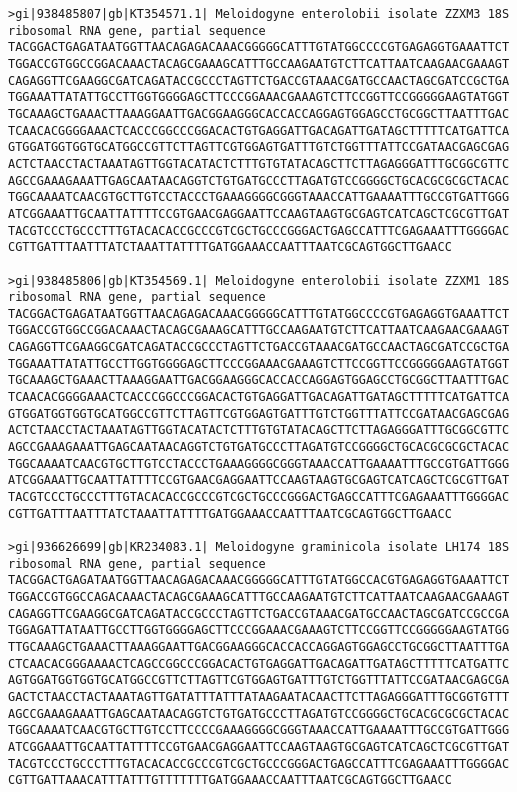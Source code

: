 \documentclass[11pt]{article}
\begin{document}
\begin{Verbatim}[commandchars=\\\{\}]
>gi|938485807|gb|KT354571.1| Meloidogyne enterolobii isolate ZZXM3 18S ribosomal RNA gene, partial sequence
TACGGACTGAGATAATGGTTAACAGAGACAAACGGGGGCATTTGTATGGCCCCGTGAGAGGTGAAATTCT
TGGACCGTGGCCGGACAAACTACAGCGAAAGCATTTGCCAAGAATGTCTTCATTAATCAAGAACGAAAGT
CAGAGGTTCGAAGGCGATCAGATACCGCCCTAGTTCTGACCGTAAACGATGCCAACTAGCGATCCGCTGA
TGGAAATTATATTGCCTTGGTGGGGAGCTTCCCGGAAACGAAAGTCTTCCGGTTCCGGGGGAAGTATGGT
TGCAAAGCTGAAACTTAAAGGAATTGACGGAAGGGCACCACCAGGAGTGGAGCCTGCGGCTTAATTTGAC
TCAACACGGGGAAACTCACCCGGCCCGGACACTGTGAGGATTGACAGATTGATAGCTTTTTCATGATTCA
GTGGATGGTGGTGCATGGCCGTTCTTAGTTCGTGGAGTGATTTGTCTGGTTTATTCCGATAACGAGCGAG
ACTCTAACCTACTAAATAGTTGGTACATACTCTTTGTGTATACAGCTTCTTAGAGGGATTTGCGGCGTTC
AGCCGAAAGAAATTGAGCAATAACAGGTCTGTGATGCCCTTAGATGTCCGGGGCTGCACGCGCGCTACAC
TGGCAAAATCAACGTGCTTGTCCTACCCTGAAAGGGGCGGGTAAACCATTGAAAATTTGCCGTGATTGGG
ATCGGAAATTGCAATTATTTTCCGTGAACGAGGAATTCCAAGTAAGTGCGAGTCATCAGCTCGCGTTGAT
TACGTCCCTGCCCTTTGTACACACCGCCCGTCGCTGCCCGGGACTGAGCCATTTCGAGAAATTTGGGGAC
CGTTGATTTAATTTATCTAAATTATTTTGATGGAAACCAATTTAATCGCAGTGGCTTGAACC

>gi|938485806|gb|KT354569.1| Meloidogyne enterolobii isolate ZZXM1 18S ribosomal RNA gene, partial sequence
TACGGACTGAGATAATGGTTAACAGAGACAAACGGGGGCATTTGTATGGCCCCGTGAGAGGTGAAATTCT
TGGACCGTGGCCGGACAAACTACAGCGAAAGCATTTGCCAAGAATGTCTTCATTAATCAAGAACGAAAGT
CAGAGGTTCGAAGGCGATCAGATACCGCCCTAGTTCTGACCGTAAACGATGCCAACTAGCGATCCGCTGA
TGGAAATTATATTGCCTTGGTGGGGAGCTTCCCGGAAACGAAAGTCTTCCGGTTCCGGGGGAAGTATGGT
TGCAAAGCTGAAACTTAAAGGAATTGACGGAAGGGCACCACCAGGAGTGGAGCCTGCGGCTTAATTTGAC
TCAACACGGGGAAACTCACCCGGCCCGGACACTGTGAGGATTGACAGATTGATAGCTTTTTCATGATTCA
GTGGATGGTGGTGCATGGCCGTTCTTAGTTCGTGGAGTGATTTGTCTGGTTTATTCCGATAACGAGCGAG
ACTCTAACCTACTAAATAGTTGGTACATACTCTTTGTGTATACAGCTTCTTAGAGGGATTTGCGGCGTTC
AGCCGAAAGAAATTGAGCAATAACAGGTCTGTGATGCCCTTAGATGTCCGGGGCTGCACGCGCGCTACAC
TGGCAAAATCAACGTGCTTGTCCTACCCTGAAAGGGGCGGGTAAACCATTGAAAATTTGCCGTGATTGGG
ATCGGAAATTGCAATTATTTTCCGTGAACGAGGAATTCCAAGTAAGTGCGAGTCATCAGCTCGCGTTGAT
TACGTCCCTGCCCTTTGTACACACCGCCCGTCGCTGCCCGGGACTGAGCCATTTCGAGAAATTTGGGGAC
CGTTGATTTAATTTATCTAAATTATTTTGATGGAAACCAATTTAATCGCAGTGGCTTGAACC

>gi|936626699|gb|KR234083.1| Meloidogyne graminicola isolate LH174 18S ribosomal RNA gene, partial sequence
TACGGACTGAGATAATGGTTAACAGAGACAAACGGGGGCATTTGTATGGCCACGTGAGAGGTGAAATTCT
TGGACCGTGGCCAGACAAACTACAGCGAAAGCATTTGCCAAGAATGTCTTCATTAATCAAGAACGAAAGT
CAGAGGTTCGAAGGCGATCAGATACCGCCCTAGTTCTGACCGTAAACGATGCCAACTAGCGATCCGCCGA
TGGAGATTATAATTGCCTTGGTGGGGAGCTTCCCGGAAACGAAAGTCTTCCGGTTCCGGGGGAAGTATGG
TTGCAAAGCTGAAACTTAAAGGAATTGACGGAAGGGCACCACCAGGAGTGGAGCCTGCGGCTTAATTTGA
CTCAACACGGGAAAACTCAGCCGGCCCGGACACTGTGAGGATTGACAGATTGATAGCTTTTTCATGATTC
AGTGGATGGTGGTGCATGGCCGTTCTTAGTTCGTGGAGTGATTTGTCTGGTTTATTCCGATAACGAGCGA
GACTCTAACCTACTAAATAGTTGATATTTATTTATAAGAATACAACTTCTTAGAGGGATTTGCGGTGTTT
AGCCGAAAGAAATTGAGCAATAACAGGTCTGTGATGCCCTTAGATGTCCGGGGCTGCACGCGCGCTACAC
TGGCAAAATCAACGTGCTTGTCCTTCCCCGAAAGGGGCGGGTAAACCATTGAAAATTTGCCGTGATTGGG
ATCGGAAATTGCAATTATTTTCCGTGAACGAGGAATTCCAAGTAAGTGCGAGTCATCAGCTCGCGTTGAT
TACGTCCCTGCCCTTTGTACACACCGCCCGTCGCTGCCCGGGACTGAGCCATTTCGAGAAATTTGGGGAC
CGTTGATTAAACATTTATTTGTTTTTTTGATGGAAACCAATTTAATCGCAGTGGCTTGAACC


\end{Verbatim}
\end{document}
